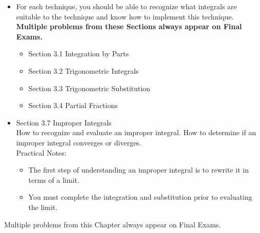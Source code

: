 \documentclass[11pt,fleqn]{article}
\begin{document}
\begin{itemize}
\item For each technique, you should be able to recognize what integrals are suitable to the technique and know how to implement this technique.  \textbf{Multiple problems from these Sections always appear on Final Exams.}
	\begin{itemize}
	\item Section 3.1 Integration by Parts
	\item Section 3.2 Trigonometric Integrals
	\item Section 3.3 Trigonometric Substitution
	\item Section 3.4 Partial Fractions
	\end{itemize}

\item Section 3.7 Improper Integrals\\

How to recognize and evaluate an improper integral. How to determine if an improper integral converges or diverges.\\

Practical Notes:
	\begin{itemize}
	\item The first step of understanding an improper integral is to rewrite it in terms of a limit.
	\item You must complete the integration and substitution prior to evaluating the limit.
	\end{itemize}
\end{itemize}


\medskip\noindent Multiple problems from this Chapter always appear on Final Exams.
\end{document}
